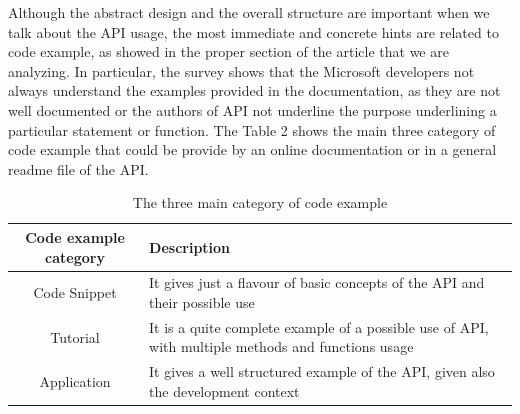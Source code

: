 Although the abstract design and the overall structure are important when we talk about the API usage, the most immediate and concrete hints are related to code example, as showed in the proper section of the article that we are analyzing. In particular, the survey shows that the Microsoft developers not always  understand the examples provided in the documentation, as they are not well documented or the authors of API not underline the purpose underlining a particular statement or function. The Table 2 shows the main three category of code example that could be provide by an online documentation or in a general readme file of the API. 
\begin{table}[H]

  \caption{ The three main category of code example }
  \label{Table:2}
\begin{adjustbox}{width=1\textwidth}

\begin{tabular}{|c|p{8cm}|}

\hline
 \textbf{Code example category } & \textbf{Description} \\
\hline
 Code Snippet & It gives just a flavour of basic concepts of the API and their possible use\\
\hline
Tutorial & It is a quite complete example of a possible use of API, with multiple methods and functions usage\\
\hline
Application & It gives a well structured example of the API, given also the development context \\
\hline
\end{tabular}

\end{adjustbox}
\end{table} 

